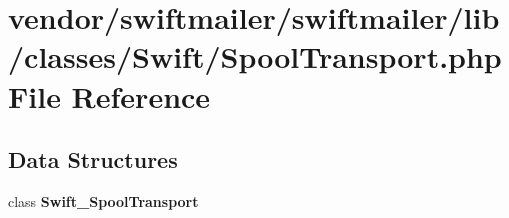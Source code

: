 \section{vendor/swiftmailer/swiftmailer/lib/classes/\+Swift/\+Spool\+Transport.php File Reference}
\label{_spool_transport_8php}
\subsection*{Data Structures}
\begin{DoxyCompactItemize}
\item 
class {\bf Swift\+\_\+\+Spool\+Transport}
\end{DoxyCompactItemize}
